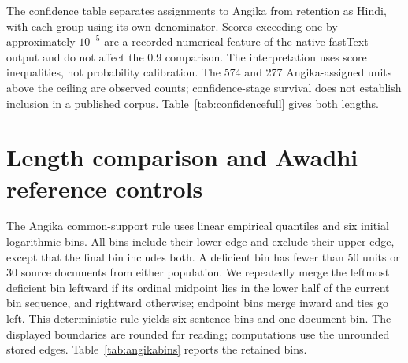 \documentclass[final]{clv2025}
\newcommand{\fitexhibit}[1]{\sbox{\exhibitbox}{}\ifdim\wd\exhibitbox>\linewidth\resizebox{\linewidth}{!}{\usebox{\exhibitbox}}\else\usebox{\exhibitbox}\fi}
\newcommand{\exhibit}[1]{\fitexhibit{tables/#1.tex}}
\begin{document}
The confidence table separates assignments to Angika from retention as Hindi, with each group using its own denominator. Scores exceeding one by approximately $10^{-5}$ are a recorded numerical feature of the native fastText output and do not affect the 0.9 comparison. The interpretation uses score inequalities, not probability calibration. The 574 and 277 Angika-assigned units above the ceiling are observed counts; confidence-stage survival does not establish inclusion in a published corpus. Table~\ref{tab:confidencefull} gives both lengths.

\begin{table}[htbp]
\centering\small\setlength{\tabcolsep}{4pt}
\exhibit{confidence_scores}
\caption{GlotLID v3 confidence on the fixed Hindi panel units. The share column uses the group size $n$ as denominator. None of the 4,000 scored units falls below 0.3.}
\label{tab:confidencefull}
\end{table}

\FloatBarrier
\section{Length comparison and Awadhi reference controls}\label{app:awadhi}

The Angika common-support rule uses linear empirical quantiles and six initial logarithmic bins. All bins include their lower edge and exclude their upper edge, except that the final bin includes both. A deficient bin has fewer than 50 units or 30 source documents from either population. We repeatedly merge the leftmost deficient bin leftward if its ordinal midpoint lies in the lower half of the current bin sequence, and rightward otherwise; endpoint bins merge inward and ties go left. This deterministic rule yields six sentence bins and one document bin. The displayed boundaries are rounded for reading; computations use the unrounded stored edges. Table~\ref{tab:angikabins} reports the retained bins.

\begin{table}[htbp]
\centering\footnotesize\setlength{\tabcolsep}{3pt}
\exhibit{angika_length_bins}
\caption{Angika-reference versus released-split Hindi assignment rates. $A$ denotes the marker-selected reference and $S$ the released split. The gap is $q_S-q_A$. Intervals are pointwise conditional source-resampling sensitivities. The document interval fails the three-bin resolution criterion and is not presented as a curve.}
\label{tab:angikabins}
\end{table}
\end{document}
